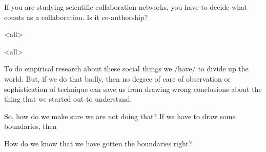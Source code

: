If you are studying scientific collaboration networks, you have to decide what counts as a collaboration. Is it co-authorship?

\mode<all>{
}

\mode<all>{
\blackout{}
}  

To do empirical research about these social things we /have/ to divide
up the world. But, if we do that badly, then no degree of care of
observation or sophistication of technique can save us from drawing
wrong conclusions about the thing that we started out to understand.

So, how do we make sure we are not doing that? If we have to draw some boundaries, then 

\begin{frame}
\begin{center}
How do we know that we have gotten the boundaries right?
\end{center}
\end{frame}


